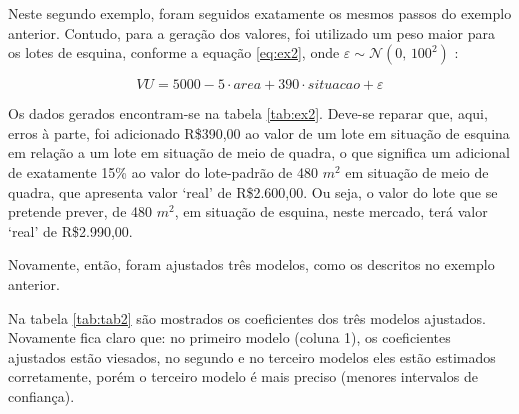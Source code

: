 \documentclass[
  a4paper, 11pt]{article}
\begin{document}
Neste segundo exemplo, foram seguidos exatamente os mesmos passos do
exemplo anterior. Contudo, para a geração dos valores, foi utilizado um
peso maior para os lotes de esquina, conforme a equação \ref{eq:ex2},
onde \(\varepsilon \sim \mathcal{N}(0, \,100^2)\) :

\begin{equation} \label{eq:ex2}
VU = 5000 - 5 \cdot area + 390 \cdot situacao + \varepsilon
\end{equation}

Os dados gerados encontram-se na tabela \ref{tab:ex2}. Deve-se reparar
que, aqui, erros à parte, foi adicionado R\$390,00 ao valor de um lote
em situação de esquina em relação a um lote em situação de meio de
quadra, o que significa um adicional de exatamente 15\% ao valor do
lote-padrão de 480 \(m^2\) em situação de meio de quadra, que apresenta
valor `real' de R\$2.600,00. Ou seja, o valor do lote que se pretende
prever, de 480 \(m^2\), em situação de esquina, neste mercado, terá
valor `real' de R\$2.990,00.

Novamente, então, foram ajustados três modelos, como os descritos no
exemplo anterior.

Na tabela \ref{tab:tab2} são mostrados os coeficientes dos três modelos
ajustados. Novamente fica claro que: no primeiro modelo (coluna 1), os
coeficientes ajustados estão viesados, no segundo e no terceiro modelos
eles estão estimados corretamente, porém o terceiro modelo é mais
preciso (menores intervalos de confiança).
\end{document}
